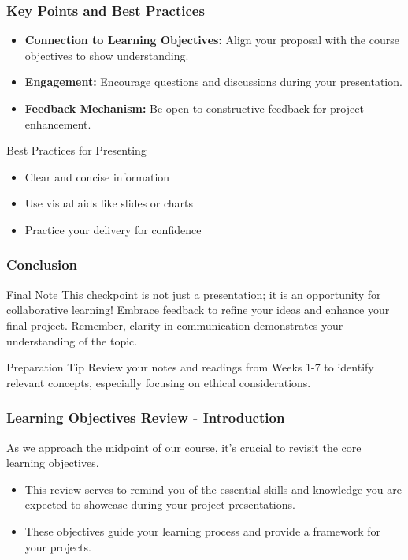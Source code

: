 \documentclass[aspectratio=169]{beamer}
\begin{document}
\begin{frame}[fragile]
    \frametitle{Key Points and Best Practices}
    \begin{itemize}
        \item \textbf{Connection to Learning Objectives:} Align your proposal with the course objectives to show understanding.
        \item \textbf{Engagement:} Encourage questions and discussions during your presentation.
        \item \textbf{Feedback Mechanism:} Be open to constructive feedback for project enhancement.
    \end{itemize}
    \begin{block}{Best Practices for Presenting}
        \begin{itemize}
            \item Clear and concise information
            \item Use visual aids like slides or charts
            \item Practice your delivery for confidence
        \end{itemize}
    \end{block}
\end{frame}

\begin{frame}[fragile]
    \frametitle{Conclusion}
    \begin{block}{Final Note}
        This checkpoint is not just a presentation; it is an opportunity for collaborative learning! Embrace feedback to refine your ideas and enhance your final project. Remember, clarity in communication demonstrates your understanding of the topic.
    \end{block}
    \begin{block}{Preparation Tip}
        Review your notes and readings from Weeks 1-7 to identify relevant concepts, especially focusing on ethical considerations.
    \end{block}
\end{frame}

\begin{frame}[fragile]
    \frametitle{Learning Objectives Review - Introduction}
    As we approach the midpoint of our course, it's crucial to revisit the core learning objectives. 
    \begin{itemize}
        \item This review serves to remind you of the essential skills and knowledge you are expected to showcase during your project presentations.
        \item These objectives guide your learning process and provide a framework for your projects.
    \end{itemize}
\end{frame}
\end{document}
